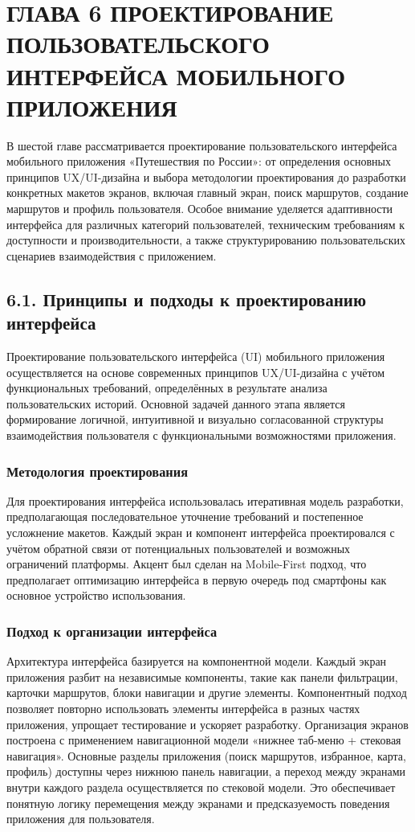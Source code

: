 \section{ГЛАВА 6 ПРОЕКТИРОВАНИЕ ПОЛЬЗОВАТЕЛЬСКОГО ИНТЕРФЕЙСА МОБИЛЬНОГО ПРИЛОЖЕНИЯ}

В шестой главе рассматривается проектирование пользовательского интерфейса мобильного приложения «Путешествия по России»: от определения основных принципов UX/UI-дизайна и выбора методологии проектирования до разработки конкретных макетов экранов, включая главный экран, поиск маршрутов, создание маршрутов и профиль пользователя. Особое внимание уделяется адаптивности интерфейса для различных категорий пользователей, техническим требованиям к доступности и производительности, а также структурированию пользовательских сценариев взаимодействия с приложением.

\subsection*{6.1. Принципы и подходы к проектированию интерфейса}
Проектирование пользовательского интерфейса (UI) мобильного приложения осуществляется на основе современных принципов UX/UI-дизайна с учётом функциональных требований, определённых в результате анализа пользовательских историй. Основной задачей данного этапа является формирование логичной, интуитивной и визуально согласованной структуры взаимодействия пользователя с функциональными возможностями приложения.

\subsubsection*{Методология проектирования}
Для проектирования интерфейса использовалась итеративная модель разработки, предполагающая последовательное уточнение требований и постепенное усложнение макетов. Каждый экран и компонент интерфейса проектировался с учётом обратной связи от потенциальных пользователей и возможных ограничений платформы. Акцент был сделан на Mobile-First подход, что предполагает оптимизацию интерфейса в первую очередь под смартфоны как основное устройство использования.

\subsubsection*{Подход к организации интерфейса}
Архитектура интерфейса базируется на компонентной модели. Каждый экран приложения разбит на независимые компоненты, такие как панели фильтрации, карточки маршрутов, блоки навигации и другие элементы. Компонентный подход позволяет повторно использовать элементы интерфейса в разных частях приложения, упрощает тестирование и ускоряет разработку.
Организация экранов построена с применением навигационной модели «нижнее таб-меню + стековая навигация». Основные разделы приложения (поиск маршрутов, избранное, карта, профиль) доступны через нижнюю панель навигации, а переход между экранами внутри каждого раздела осуществляется по стековой модели. Это обеспечивает понятную логику перемещения между экранами и предсказуемость поведения приложения для пользователя.

